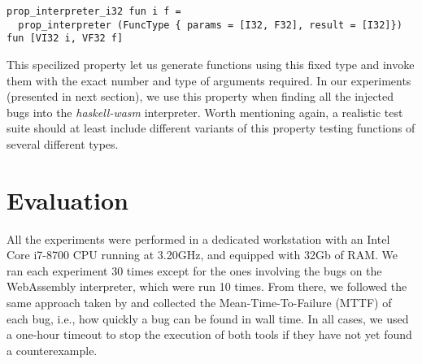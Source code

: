 \documentclass[acmsmall, anonymous]{acmart}
\newcommand{\mutagen}{\textsc{Mutagen}\xspace}
\begin{document}
\begin{verbatim}
prop_interpreter_i32 fun i f =
  prop_interpreter (FuncType { params = [I32, F32], result = [I32]}) fun [VI32 i, VF32 f]
\end{verbatim}

This specilized property let us generate functions using this fixed type and
invoke them with the exact number and type of arguments required.
%
In our experiments (presented in next section), we use this property when
finding all the injected bugs into the \textit{haskell-wasm} interpreter.
%
Worth mentioning again, a realistic test suite should at least include different
variants of this property testing functions of several different types.




\section{Evaluation}
\label{sec:evaluation}

All the experiments were performed in a dedicated workstation with an Intel Core
i7-8700 CPU running at 3.20GHz, and equipped with 32Gb of RAM.
%
We ran each experiment 30 times except for the ones involving the bugs on the
WebAssembly interpreter, which were run 10 times.
%
From there, we followed the same approach taken by
\citeauthor{lampropoulos2019coverage} and collected the Mean-Time-To-Failure
(MTTF) of each bug, i.e., how quickly a bug can be found in wall time.
%
In all cases, we used a one-hour timeout to stop the execution of both tools if
they have not yet found a counterexample.
\end{document}
